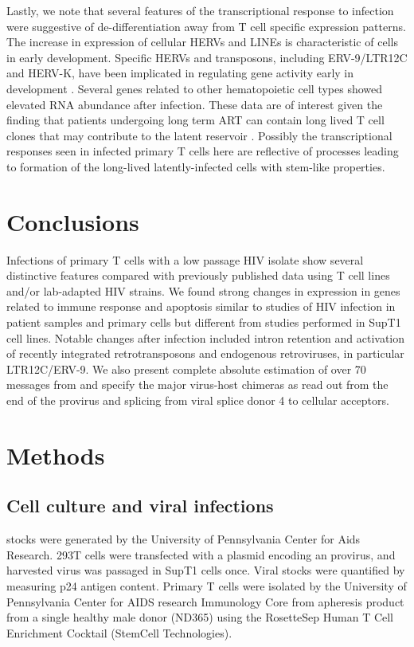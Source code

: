 \documentclass[../sherrill-Mix_thesis.tex]{subfiles}
\begin{document}
	Lastly, we note that several features of the transcriptional response to \hivEight{} infection were suggestive of de-differentiation away from T cell specific expression patterns. The increase in expression of cellular HERVs and LINEs is characteristic of cells in early development. Specific HERVs and transposons, including ERV-9/LTR12C and HERV-K, have been implicated in regulating gene activity early in development \citep{Ling2002,Pi2004,Santoni2012,Fuchs2013,Fort2014,Wang2014}. Several genes related to other hematopoietic cell types showed elevated RNA abundance after \hivEight{} infection. These data are of interest given the finding that patients undergoing long term ART can contain long lived T cell clones that may contribute to the latent reservoir \citep{Joos2008,Brennan2009,Wagner2013,Kearney2014,Cohn2015}.  Possibly the transcriptional responses seen in infected primary T cells here are reflective of processes leading to formation of the long-lived latently-infected cells with stem-like properties.

\section{Conclusions}
	Infections of primary T cells with a low passage HIV isolate show several distinctive features compared with previously published data using T cell lines and/or lab-adapted HIV strains. We found strong changes in expression in genes related to immune response and apoptosis similar to studies of HIV infection in patient samples and primary cells but different from studies performed in SupT1 cell lines. Notable changes after infection included intron retention and activation of recently integrated retrotransposons and endogenous retroviruses, in particular LTR12C/ERV-9. We also present complete absolute estimation of over 70 messages from \hivEight{} and specify the major virus-host chimeras as read out from the \threePrime{} end of the provirus and splicing from viral splice donor 4 to cellular acceptors.

\section{Methods}
	\subsection{Cell culture and viral infections}
		\hivEight{} stocks were generated by the University of Pennsylvania Center for Aids Research. 293T cells were transfected with a plasmid encoding an \hivEight{} provirus, and harvested virus was passaged in SupT1 cells once. Viral stocks were quantified by measuring p24 antigen content.  Primary \cdFour{} T cells were isolated by the University of Pennsylvania Center for AIDS research Immunology Core from apheresis product from a single healthy male donor (ND365) using the RosetteSep Human \cdFour{} T Cell Enrichment Cocktail (StemCell Technologies).
\end{document}
